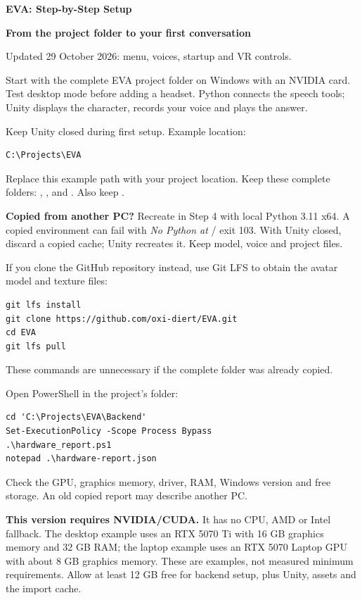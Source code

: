 {\huge\bfseries EVA: Step-by-Step Setup}\par
\textbf{From the project folder to your first conversation}\par
{\small Updated 29 October 2026: menu, voices, startup and VR controls.}

Start with the complete EVA project folder on Windows with an NVIDIA card.
Test desktop mode before adding a headset. Python connects the speech tools;
Unity displays the character, records your voice and plays the answer.

Keep Unity closed during first setup. Example location:
\begin{lstlisting}
C:\Projects\EVA
\end{lstlisting}
Replace this example path with your project location. Keep these complete folders:
, ,  and .
Also keep .

\textbf{Copied from another PC?} Recreate  in Step 4 with local
Python 3.11 x64. A copied environment can fail with \textit{No Python at} / exit 103.
With Unity closed, discard a copied  cache; Unity recreates it.
Keep model, voice and project files.

If you clone the GitHub repository instead, use Git LFS to obtain the avatar
model and texture files:
\begin{lstlisting}
git lfs install
git clone https://github.com/oxi-diert/EVA.git
cd EVA
git lfs pull
\end{lstlisting}
These commands are unnecessary if the complete folder was already copied.

Open PowerShell in the project's  folder:
\begin{lstlisting}
cd 'C:\Projects\EVA\Backend'
Set-ExecutionPolicy -Scope Process Bypass
.\hardware_report.ps1
notepad .\hardware-report.json
\end{lstlisting}
Check the GPU, graphics memory, driver, RAM, Windows version and free storage.
An old copied report may describe another PC.

\textbf{This version requires NVIDIA/CUDA.} It has no CPU, AMD or Intel fallback.
The desktop example uses an RTX 5070 Ti with 16 GB graphics memory and 32 GB RAM;
the laptop example uses an RTX 5070 Laptop GPU with about 8 GB graphics memory.
These are examples, not measured minimum requirements. Allow at least 12 GB free
for backend setup, plus Unity, assets and the import cache.

